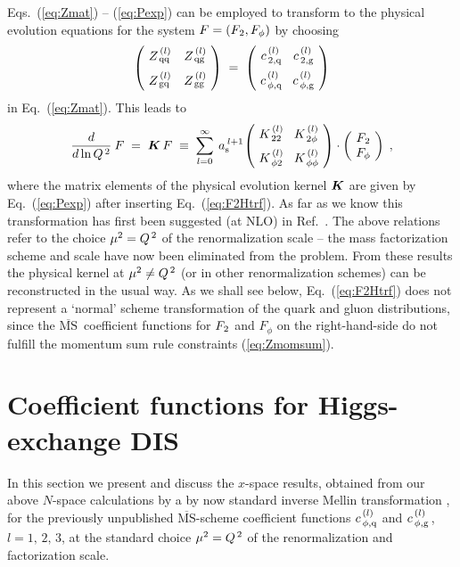 \documentclass[12pt]{article}
\newcommand{\beq}{\begin{equation}}
\newcommand{\eeq}{\end{equation}}
\newcommand{\MSb}{$\overline{\mbox{MS}}$}
\newcommand{\ar}{a_{\rm s}}
\newcommand{\KV}{\mbox{\boldmath $K$}}
\begin{document}
Eqs.~(\ref{eq:Zmat}) -- (\ref{eq:Pexp}) can be employed to transform to the 
physical evolution equations for the system $F = ({F_{\:\! 2}}, F_\phi)$ by choosing
%
\beq
\label{eq:F2Htrf}
  \left( \begin{array}{cc}
       \!  Z_{\,\rm qq}^{\,(l)} & Z_{\,\rm qg}^{\,(l)} \! \\[2mm]
       \!  Z_{\,\rm gq}^{\,(l)} & Z_{\,\rm gg}^{\,(l)} \! 
         \end{array} \right)
  \; = \;
  \left( \begin{array}{cc}
       \!  c_{\,\rm 2,q}^{\,(l)} \! & c_{\,\rm 2,g}^{\,(l)} \! \\[2mm]
       \!  c_{\,\rm \phi,q}^{\,(l)} \! & c_{\,\rm \phi,g}^{\,(l)} \!
         \end{array} \right) 
\eeq
%
in Eq.~(\ref{eq:Zmat}). This leads to
%
\beq
\label{eq:Kab}
  \frac{d}{d \ln \Qs }\: F \; = \; \KV\, F
  \; \equiv \; \sum_{l=0}^{\infty} \: \ar^{\:l+1\!} 
    \left( \begin{array}{cc}
       \!  K_{\, 22}^{\,(l)} \! & K_{\, 2\phi}^{\,(l)} \! \\[2mm]
       \!  K_{\, \phi 2}^{\,(l)} \! & K_{\,\phi\phi}^{\,(l)} \!
         \end{array} \right)
  \cdot
  \left( \begin{array}{c} \!\Ftwo\! \\ \!F_\phi\! \end{array} \right)
  \; ,
\eeq
%
where the matrix elements of the physical evolution kernel $\KV$ are given by 
Eq.~(\ref{eq:Pexp}) after inserting Eq.~(\ref{eq:F2Htrf}). As far as we know
this transformation has first been suggested (at NLO) in Ref.~\cite{FP82}.
The above relations refer to the choice $\mu^2 = {Q^{\, 2}}$ of the renormalization
scale -- the mass factorization scheme and scale have now been eliminated from
the problem. From these results the physical kernel at $\mu^2 \neq {Q^{\, 2}}$ (or in 
other renormalization schemes) can be reconstructed in the usual way.
As we shall see below, Eq.~(\ref{eq:F2Htrf})  does not represent a `normal' 
scheme transformation of the quark and gluon distributions, since the \MSb\ 
coefficient functions for ${F_{\:\! 2}}$ and $F_\phi$ on the right-hand-side do not 
fulfill the momentum sum rule constraints (\ref{eq:Zmomsum}).
%
%
\setcounter{equation}{0}
\section{Coefficient functions for Higgs-exchange DIS}
\label{sec:coeffs}
%
%
In this section we present and discuss the $x$-space results, obtained from our
above $N$-space calculations by a by now standard inverse Mellin transformation 
\cite{Moch:1999eb,Remiddi:1999ew}, for the previously unpublished \MSb-scheme 
coefficient functions $c_{\,\rm \phi,q}^{\,(l)}$ and 
$c_{\,\rm \phi,g\,}^{\,(l)}$, $l = 1,\,2,\,3$, at the standard choice 
$\mu^2 = {Q^{\, 2}}$ of the renormalization and factorization scale.
\end{document}
